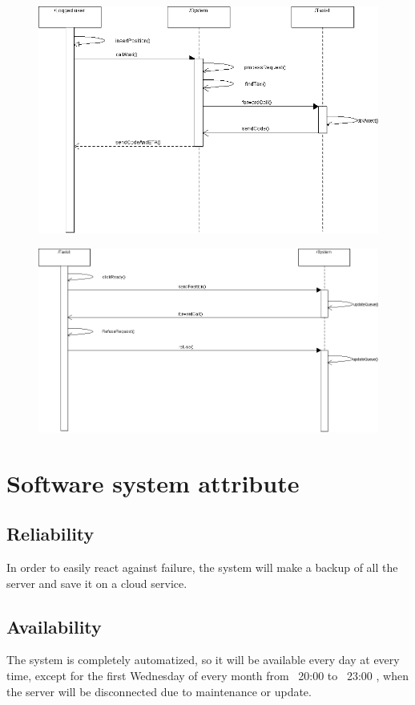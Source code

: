   \begin{figure} [h]
  \centering
  \includegraphics [scale=0.4]{sequencecall.png}
  \end{figure}
\newpage

  \begin{figure} [h]
  \centering
  \includegraphics [scale=0.4]{sequencerefuse.png}
  \end{figure}
\newpage

\section{Software system attribute}
  \subsection{Reliability}
  In order to easily react against failure, the system will make a backup of all the server and save it on a cloud service.
  \subsection{Availability}
  The system is completely automatized, so it will be available every day at every time, except for the first Wednesday 
  of every month from ~20:00 to ~23:00 , when the server will be disconnected due to maintenance or update.
